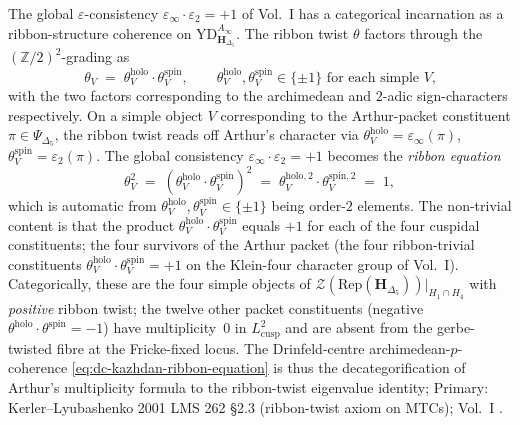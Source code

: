 \begin{remark}[\texorpdfstring{$\varepsilon_\infty\cdot\varepsilon_2 = 1$}{eps-infcdoteps-2 = 1} as ribbon-structure coherence]
\label{rem:dc-kazhdan-eps-ribbon}
The global $\varepsilon$-consistency
$\varepsilon_\infty\cdot\varepsilon_2 = +1$ of Vol.~I
\cite{VolI} has a categorical
incarnation as a ribbon-structure coherence on
$\mathrm{YD}^{A_\infty}_{\mathbf H_{\Delta_5}}$. The ribbon twist
$\theta$ factors through the $(\mathbb Z/2)^2$-grading as
\begin{equation}
\label{eq:dc-kazhdan-ribbon-factorisation}
 \theta_V
 \;=\;
 \theta^{\mathrm{holo}}_V
 \cdot
 \theta^{\mathrm{spin}}_V,
 \qquad
 \theta^{\mathrm{holo}}_V, \theta^{\mathrm{spin}}_V \in \{\pm 1\}
 \text{ for each simple $V$,}
\end{equation}
with the two factors corresponding to the archimedean and $2$-adic
sign-characters respectively. On a simple object $V$ corresponding to
the Arthur-packet constituent $\pi \in \Psi_{\Delta_5}$,
the ribbon twist reads off Arthur's character via
$\theta^{\mathrm{holo}}_V = \varepsilon_\infty(\pi)$,
$\theta^{\mathrm{spin}}_V = \varepsilon_2(\pi)$. The global consistency
$\varepsilon_\infty\cdot\varepsilon_2 = +1$ becomes the
\emph{ribbon equation}
\begin{equation}
\label{eq:dc-kazhdan-ribbon-equation}
 \theta_V^2
 \;=\;
 (\theta^{\mathrm{holo}}_V\cdot\theta^{\mathrm{spin}}_V)^2
 \;=\;
 \theta^{\mathrm{holo},2}_V\cdot\theta^{\mathrm{spin},2}_V
 \;=\;
 1,
\end{equation}
which is automatic from $\theta_V^{\mathrm{holo}}, \theta_V^{\mathrm{spin}}
\in \{\pm 1\}$ being order-$2$ elements. The non-trivial content is
that the product $\theta^{\mathrm{holo}}_V\cdot\theta^{\mathrm{spin}}_V$
equals $+1$ for each of the four cuspidal
constituents; the four survivors of the Arthur packet (the four ribbon-trivial
constituents $\theta^{\mathrm{holo}}_V \cdot \theta^{\mathrm{spin}}_V = +1$
on the Klein-four character group of Vol.~I). Categorically, these are the four
simple objects of
$\mathcal Z(\mathrm{Rep}(\mathbf H_{\Delta_5}))|_{H_1\cap H_4}$
with \emph{positive} ribbon twist; the twelve other packet constituents
(negative $\theta^{\mathrm{holo}}\cdot\theta^{\mathrm{spin}} = -1$)
have multiplicity~$0$ in $L^2_{\mathrm{cusp}}$ and are absent from the
gerbe-twisted fibre at the Fricke-fixed locus. The Drinfeld-centre
archimedean-$p$-coherence
\eqref{eq:dc-kazhdan-ribbon-equation} is thus the decategorification
of Arthur's multiplicity formula to the ribbon-twist eigenvalue
identity; Primary:
Kerler--Lyubashenko 2001 LMS 262 \S 2.3
(ribbon-twist axiom on MTCs); Vol.~I
\cite{VolI}.
\end{remark}

